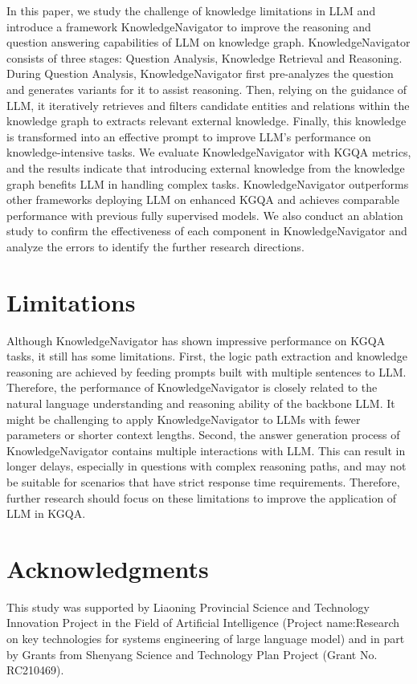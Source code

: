 \documentclass{article}
\begin{document}
In this paper, we study the challenge of knowledge limitations in LLM and introduce a framework KnowledgeNavigator to improve the reasoning and question answering capabilities of LLM on knowledge graph. KnowledgeNavigator consists of three stages: Question Analysis, Knowledge Retrieval and Reasoning. During Question Analysis, KnowledgeNavigator first pre-analyzes the question and generates variants for it to assist reasoning. Then, relying on the guidance of LLM, it iteratively retrieves and filters candidate entities and relations within the knowledge graph to extracts relevant external knowledge. Finally, this knowledge is transformed into an effective prompt to improve LLM's performance on knowledge-intensive tasks. We evaluate KnowledgeNavigator with KGQA metrics, and the results indicate that introducing external knowledge from the knowledge graph benefits LLM in handling complex tasks. KnowledgeNavigator outperforms other frameworks deploying LLM on enhanced KGQA and achieves comparable performance with previous fully supervised models. We also conduct an ablation study to confirm the effectiveness of each component in KnowledgeNavigator and analyze the errors to identify the further research directions.



\section{Limitations}


Although KnowledgeNavigator has shown impressive performance on KGQA tasks, it still has some limitations. First, the logic path extraction and knowledge reasoning are achieved by feeding prompts built with multiple sentences to LLM. Therefore, the performance of KnowledgeNavigator is closely related to the natural language understanding and reasoning ability of the backbone LLM. It might be challenging to apply KnowledgeNavigator to LLMs with fewer parameters or shorter context lengths. Second, the answer generation process of KnowledgeNavigator contains multiple interactions with LLM. This can result in longer delays, especially in questions with complex reasoning paths, and may not be suitable for scenarios that have strict response time requirements.  Therefore, further research should focus on these limitations to improve the application of LLM in KGQA.

 
\section*{Acknowledgments}
This study was supported by Liaoning Provincial Science and Technology Innovation Project in the Field of Artificial Intelligence (Project name:Research on key technologies for systems engineering of large language model) and in part by Grants from Shenyang Science and Technology Plan Project (Grant No. RC210469). 



\end{document}
